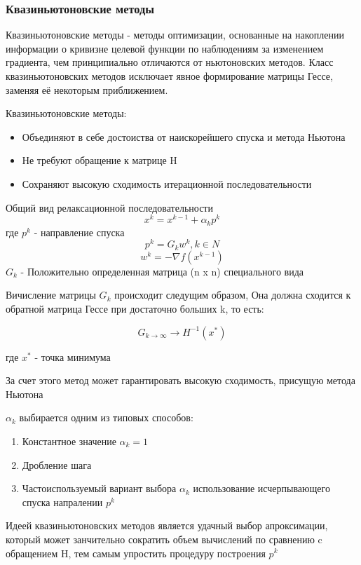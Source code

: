 \documentclass[a4paper, 14pt]{article}
\begin{document}
	\subsubsection*{Квазиньютоновские методы}

Квазиньютоновские методы - методы оптимизации, основанные на накоплении информации о кривизне целевой функции по наблюдениям за изменением градиента, чем принципиально отличаются от ньютоновских методов. Класс квазиньютоновских методов исключает явное формирование матрицы Гессе, заменяя её некоторым приближением. 

Квазиньютоновские методы:
\begin{itemize}
	\item Объединяют в себе достоиства от наискорейшего спуска и метода Ньютона
	\item Не требуют обращение к матрице H
	\item Сохраняют высокую сходимость итерационной последовательности 
\end{itemize}

Общий вид релаксационной последовательности
\[x^k = x^{k - 1} + \alpha_k p^k\]
где $p^k$ - направление спуска
\[p^k = G_k w^k,  k \in N\]
\[
w^k = - \nabla f(x^{k- 1})\]
$G_k$ - Положительно определенная матрица (n x n) специального вида

Вичисление матрицы $G_k$ происходит следущим образом, Она должна сходится к обратной матрица Гессе при достаточно больших k, то есть:

\[G_{k \longrightarrow \infty} \longrightarrow H^{-1}(x^*)\]

где $x^*$ - точка минимума

За счет этого метод может гарантировать высокую сходимость, присущую метода Ньютона

$\alpha_k$ выбирается одним из типовых способов:

\begin{enumerate}
\item Константное значение $\alpha_k = 1$
\item Дробление шага
\item Частоиспользуемый вариант выбора $\alpha_k$ использование исчерпывающего спуска  напралении $p^k$
\end{enumerate} 

Идеей квазиньютоновских методов является удачный выбор апроксимации, который может занчительно сократить объем вычислений по сравнению c обращением H, тем самым упростить процедуру построения $p^k$
\end{document}
